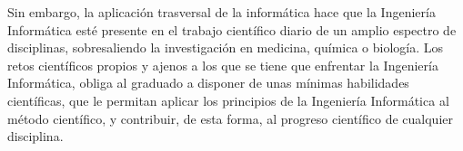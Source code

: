 Sin embargo, la aplicación trasversal de la informática hace que la Ingeniería Informática esté presente en el trabajo científico diario de un amplio espectro de disciplinas, sobresaliendo la investigación en medicina, química o biología. Los retos científicos propios y ajenos a los que se tiene que enfrentar la Ingeniería Informática, obliga al graduado a disponer de unas mínimas habilidades científicas, que le permitan aplicar los principios de la Ingeniería Informática al método científico, y contribuir, de esta forma, al progreso científico de cualquier disciplina.

